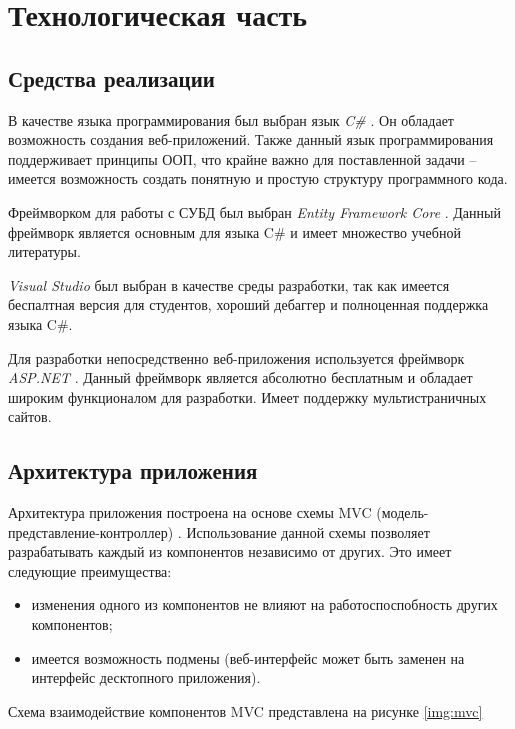 \chapter{Технологическая часть}

\section{Средства реализации}

В качестве языка программирования был выбран язык \textit{C\#} \cite{csharp}. Он обладает возможность создания веб-приложений. Также данный язык программирования поддерживает принципы ООП, что крайне важно для поставленной задачи -- имеется возможность создать понятную и простую структуру программного кода.

Фреймворком для работы с СУБД был выбран \textit{Entity Framework Core} \cite{ef_core}. Данный фреймворк является основным для языка C\# и имеет множество учебной литературы.

\textit{Visual Studio} \cite{vs} был выбран в качестве среды разработки, так как имеется беспалтная версия для студентов, хороший дебаггер и полноценная поддержка языка C\#. 

Для разработки непосредственно веб-приложения используется фреймворк \textit{ASP.NET} \cite{asp}. Данный фреймворк является абсолютно бесплатным и обладает широким функционалом для разработки. Имеет поддержку мультистраничных сайтов.


\section{Архитектура приложения}

Архитектура приложения построена на основе схемы MVC (модель-представление-контроллер) \cite{mvc}. Использование данной схемы позволяет разрабатывать каждый из компонентов независимо от других. Это имеет следующие преимущества:

\begin{itemize}
    \item изменения одного из компонентов не влияют на работоспоспобность других компонентов;
    \item имеется возможность подмены (веб-интерфейс может быть заменен на интерфейс десктопного приложения).
\end{itemize}

Схема взаимодействие компонентов MVC представлена на рисунке \ref{img:mvc}


